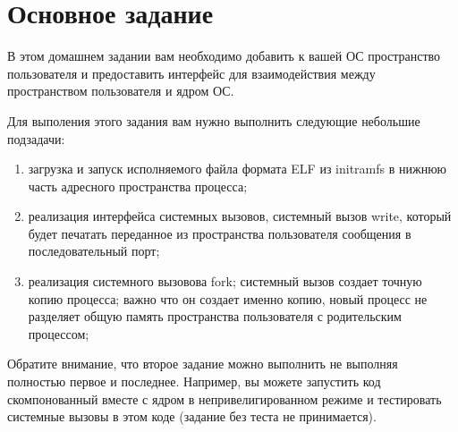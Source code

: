 \section{Основное задание}

В этом домашнем задании вам необходимо добавить к вашей ОС пространство
пользователя и предоставить интерфейс для взаимодействия между пространством
пользователя и ядром ОС.

Для выполения этого задания вам нужно выполнить следующие небольшие подзадачи:

\begin{enumerate}
  \item загрузка и запуск исполняемого файла формата ELF из initramfs в нижнюю
        часть адресного пространства процесса;
  \item реализация интерфейса системных вызовов, системный вызов write, который
        будет печатать переданное из пространства пользователя сообщения в
        последовательный порт;
  \item реализация системного вызовова fork; системный вызов создает точную
        копию процесса; важно что он создает именно копию, новый процесс не
        разделяет общую память пространства пользователя с родительским процессом;
\end{enumerate}

Обратите внимание, что второе задание можно выполнить не выполняя полностью
первое и последнее. Например, вы можете запустить код скомпонованный вместе с
ядром в непривелигированном режиме и тестировать системные вызовы в этом коде
(задание без теста не принимается).
